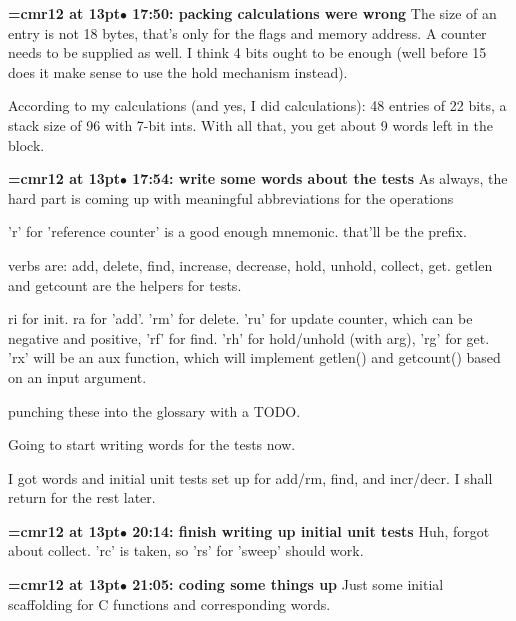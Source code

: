 {\smallskip\noindent\bf\font\titlefont=cmr12 at 13pt\titlefont $\bullet$ 17:50: packing calculations were wrong}\smallskip
The size of an entry is not 18 bytes, that's only for the flags and memory address. A counter needs to be supplied as well. I think 4 bits ought to be enough (well before 15 does it make sense to use the hold mechanism instead).
\par

According to my calculations (and yes, I did calculations): 48 entries of 22 bits, a stack size of 96 with 7-bit ints. With all that, you get about 9 words left in the block.
\par

{\smallskip\noindent\bf\font\titlefont=cmr12 at 13pt\titlefont $\bullet$ 17:54: write some words about the tests}\smallskip
As always, the hard part is coming up with meaningful abbreviations for the operations
\par

'r' for 'reference counter' is a good enough mnemonic. that'll be the prefix.
\par

verbs are: add, delete, find, increase, decrease, hold, unhold, collect, get. getlen and getcount are the helpers for tests.
\par

ri for init. ra for 'add'. 'rm' for delete. 'ru' for update counter, which can be negative and positive, 'rf' for find. 'rh' for hold/unhold (with arg), 'rg' for get. 'rx' will be an aux function, which will implement getlen() and getcount() based on an input argument.
\par

punching these into the glossary with a TODO.
\par

Going to start writing words for the tests now.
\par

I got words and initial unit tests set up for add/rm, find, and incr/decr. I shall return for the rest later.
\par

{\smallskip\noindent\bf\font\titlefont=cmr12 at 13pt\titlefont $\bullet$ 20:14: finish writing up initial unit tests}\smallskip
Huh, forgot about collect. 'rc' is taken, so 'rs' for 'sweep' should work.
\par

{\smallskip\noindent\bf\font\titlefont=cmr12 at 13pt\titlefont $\bullet$ 21:05: coding some things up}\smallskip
Just some initial scaffolding for C functions and corresponding words.
\par


